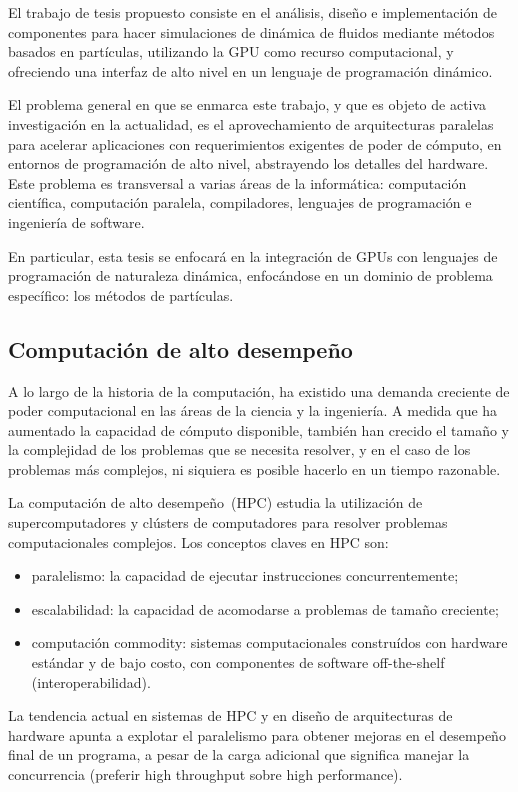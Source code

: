 \documentclass[11pt,spanish]{article}
\begin{document}
El trabajo de tesis propuesto consiste en el análisis, diseño e implementación
de componentes para hacer simulaciones de dinámica de fluidos mediante métodos
basados en partículas, utilizando la GPU como recurso computacional, y
ofreciendo una interfaz de alto nivel en un lenguaje de programación dinámico.

El problema general en que se enmarca este trabajo, y que es objeto de activa
investigación en la actualidad, es el aprovechamiento de arquitecturas paralelas
para acelerar aplicaciones con requerimientos exigentes de poder de cómputo, en
entornos de programación de alto nivel, abstrayendo los detalles del hardware.
Este problema es transversal a varias áreas de la informática: computación
científica, computación paralela, compiladores, lenguajes de programación e
ingeniería de software.

En particular, esta tesis se enfocará en la integración de GPUs con lenguajes de
programación de naturaleza dinámica, enfocándose en un dominio de problema
específico: los métodos de partículas.


\subsection{Computación de alto desempeño}

A lo largo de la historia de la computación, ha existido una demanda creciente de poder
computacional en las áreas de la ciencia y la ingeniería.  A medida que ha
aumentado la capacidad de cómputo disponible, también han crecido el tamaño y la
complejidad de los problemas que se necesita resolver, y en el caso de los
problemas más complejos, ni siquiera es posible hacerlo en un tiempo razonable.
\cite{parallel-programming}

La computación de alto desempeño~(HPC) estudia la utilización de supercomputadores y
clústers de computadores para resolver problemas computacionales complejos.  Los
conceptos claves en HPC son:
\begin{itemize}
   \item paralelismo:
     la capacidad de ejecutar instrucciones concurrentemente;
   \item escalabilidad:
     la capacidad de acomodarse a problemas de tamaño creciente;
   \item computación commodity:
     sistemas computacionales construídos con hardware
     estándar y de bajo costo, con componentes de software off-the-shelf
     (interoperabilidad).
\end{itemize}
La tendencia actual en sistemas de HPC y en diseño de arquitecturas de hardware
apunta a explotar el paralelismo para obtener mejoras en el desempeño final de un
programa, a pesar de la carga adicional que significa manejar la concurrencia
(preferir high throughput sobre high performance).
\end{document}
